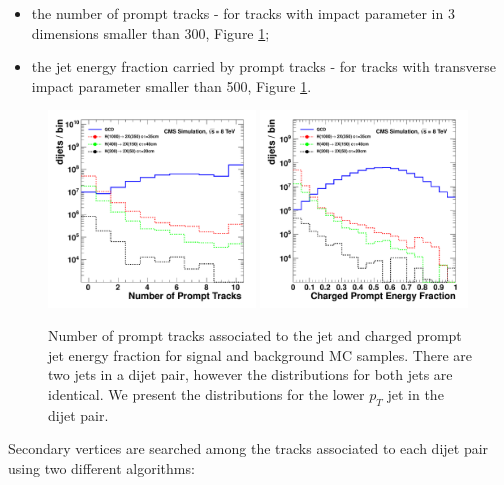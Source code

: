 \begin{itemize}
\item the number of prompt tracks - for tracks with impact parameter in 3 dimensions smaller than 300\micron, 
Figure \ref{fig:discprompt}; 
\item the jet energy fraction carried by prompt tracks - for tracks with transverse impact parameter smaller 
than 500\micron, Figure \ref{fig:discprompt}.

\end{itemize} 

\begin{figure}
\centering
\includegraphics[width=0.49\textwidth]{plots/discrimination/disc_NPromptTracks.pdf}
\includegraphics[width=0.49\textwidth]{plots/discrimination/disc_PromptEnergyFrac.pdf}
\caption{Number of prompt tracks associated to the jet and charged prompt jet energy fraction for signal and
background MC samples. There are two jets in a dijet pair, however the distributions for both jets are identical.
We present the distributions for the lower $p_T$ jet in the dijet pair.
\label{fig:discprompt}}

\end{figure}

Secondary vertices are searched among the tracks associated to each dijet pair 
using two different algorithms: 

